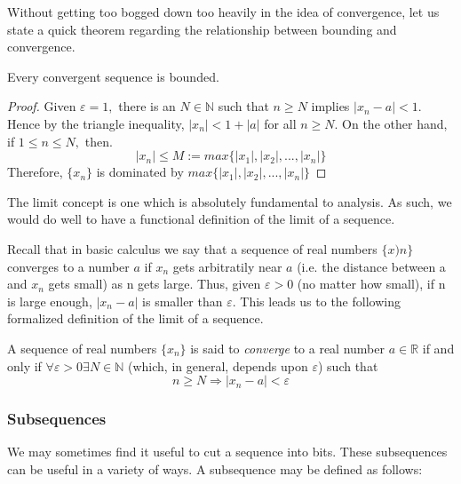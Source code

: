 Without getting too bogged down too heavily in the idea of convergence, let us state a quick theorem regarding the relationship between bounding and convergence.

\begin{theorem}
Every convergent sequence is bounded.
\end{theorem}

\begin{proof}
Given $\varepsilon=1,$ there is an $N \in \mathbb{N}$ such that $n \geq N$ implies $|x_n-a| < 1.$ Hence by the triangle inequality, $|x_n| < 1 + |a|$ for all $n \geq N.$ On the other hand, if $1 \leq n \leq N,$ then. $$|x_n| \leq M := max\{|x_1|,|x_2|, ...,|x_n|\}$$ Therefore, $\{x_n\}$ is dominated by $max\{|x_1|,|x_2|, ...,|x_n|\}$
\end{proof}

The limit concept is one which is absolutely fundamental to analysis. As such, we would do well to have a functional definition of the limit of a sequence. \newline

Recall that in basic calculus we say that a sequence of real numbers $\{x)n\}$ converges to a number $a$ if $x_n$ gets arbitratily  near $a$ (i.e. the distance between a and $x_n$ gets small) as n gets large. Thus, given $\varepsilon > 0$ (no matter how small), if n is large enough,  $|x_n - a|$ is smaller than $\varepsilon$. This leads us to the following formalized definition of the limit of a sequence.

\begin{definition}

A sequence of real numbers $\{x_n\}$ is said to \emph{converge} to a real number $a \in \mathbb{R}$ if and only if $\forall \varepsilon > 0 \exists N \in \mathbb{N}$ (which, in general, depends upon $\varepsilon$) such that
$$ n \geq N \Rightarrow |x_n - a| < \varepsilon$$
\end{definition}



\subsubsection{Subsequences}
We may sometimes find it useful to cut a sequence into bits. These subsequences can be useful in a variety of ways. A subsequence may be defined as follows: 

